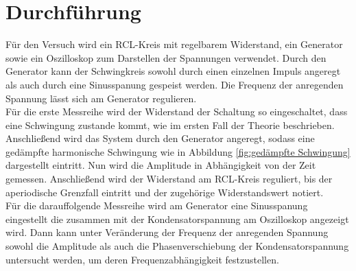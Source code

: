 \section{Durchführung}
Für den Versuch wird ein RCL-Kreis mit regelbarem Widerstand, ein Generator sowie ein Oszilloskop zum Darstellen der Spannungen verwendet. Durch den Generator kann der Schwingkreis sowohl durch einen einzelnen Impuls angeregt als auch durch eine Sinusspanung gespeist werden. Die Frequenz der anregenden Spannung lässt sich am Generator regulieren.  \\
Für die erste Messreihe wird der Widerstand der Schaltung so eingeschaltet, dass eine Schwingung zustande kommt, wie im ersten Fall der Theorie beschrieben. Anschließend wird das System durch den Generator angeregt, sodass eine gedämpfte harmonische Schwingung wie in Abbildung \ref{fig:gedämpfte Schwingung} dargestellt eintritt. Nun wird die Amplitude in Abhängigkeit von der Zeit gemessen. Anschließend wird der Widerstand am RCL-Kreis reguliert, bis der aperiodische Grenzfall eintritt und der zugehörige Widerstandswert notiert. \\
Für die darauffolgende Messreihe wird am Generator eine Sinusspanung eingestellt die zusammen mit der Kondensatorspannung am Oszilloskop angezeigt wird. Dann kann unter Veränderung der Frequenz der anregenden Spannung sowohl die Amplitude als auch die Phasenverschiebung der Kondensatorspannung untersucht werden, um deren Frequenzabhängigkeit festzustellen. 
